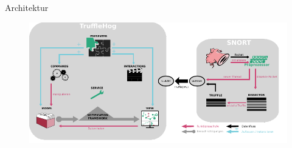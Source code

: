 \begin{frame}{Architektur}
    \begin{figure}
    	\centering
    	\includegraphics[width=\textwidth]{./images/16.pdf}
    \end{figure}
\end{frame}

